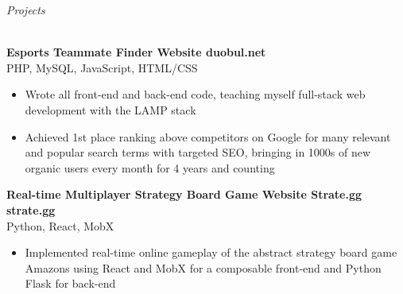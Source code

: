\documentclass[letterpaper]{article}
\newcommand{\lineunder} {
    \vspace*{-8pt} \\
    \hspace*{-3pt} \hrulefill \\
}
\newcommand{\header} [1] {
	{\hspace*{-3pt}\vspace*{6pt} \textit{#1}}
    \vspace*{-6pt} \lineunder
}
\newcommand{\expheader}[4]{
    \vspace{2mm}
    \textbf{#1 \hfill #2}\\
    #3 \hfill #4\\
    \vspace{-3mm}
}
\begin{document}
\header{Projects}
\vspace{-1mm}

\expheader{Esports Teammate Finder Website}{duobul.net}{PHP, MySQL, JavaScript, HTML/CSS}{}
\begin{itemize} \itemsep 0pt
\item Wrote all front-end and back-end code, teaching myself full-stack web development with the LAMP stack \\
\item Achieved 1st place ranking above competitors on Google for many relevant and popular search terms with targeted SEO, bringing in 1000s of new organic users every month for 4 years and counting\\

\end{itemize}

\vspace{2mm}

\expheader{Real-time Multiplayer Strategy Board Game Website
Strate.gg}{strate.gg}{Python, React, MobX}{}
\begin{itemize} \itemsep 0pt
\item Implemented real-time online gameplay of the abstract strategy board game Amazons using React and MobX for a composable front-end and Python Flask for back-end\\
\end{itemize}
\end{document}
